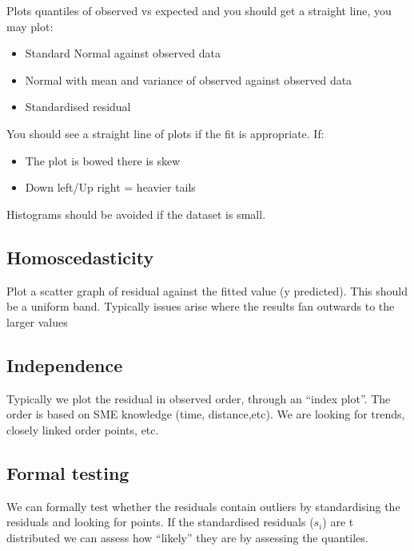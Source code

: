 \documentclass[
  letterpaper,
  DIV=11,
  numbers=noendperiod]{scrreprt}
\providecommand{\tightlist}{%
  \setlength{\itemsep}{0pt}\setlength{\parskip}{0pt}}\usepackage{longtable,booktabs,array}
\begin{document}
Plots quantiles of observed vs expected and you should get a straight
line, you may plot:

\begin{itemize}
\tightlist
\item
  Standard Normal against observed data
\item
  Normal with mean and variance of observed against observed data
\item
  Standardised residual
\end{itemize}

You should see a straight line of plots if the fit is appropriate. If:

\begin{itemize}
\tightlist
\item
  The plot is bowed there is skew
\item
  Down left/Up right = heavier tails
\end{itemize}

Histograms should be avoided if the dataset is small.

\hypertarget{homoscedasticity}{%
\subsection{Homoscedasticity}\label{homoscedasticity}}

Plot a scatter graph of residual against the fitted value (y predicted).
This should be a uniform band. Typically issues arise where the results
fan outwards to the larger values

\hypertarget{independence}{%
\subsection{Independence}\label{independence}}

Typically we plot the residual in observed order, through an ``index
plot''. The order is based on SME knowledge (time, distance,etc). We are
looking for trends, closely linked order points, etc.

\hypertarget{formal-testing}{%
\subsection{Formal testing}\label{formal-testing}}

We can formally test whether the residuals contain outliers by
standardising the residuals and looking for points. If the standardised
residuals (\(s_i\)) are t distributed we can assess how ``likely'' they
are by assessing the quantiles.
\end{document}
